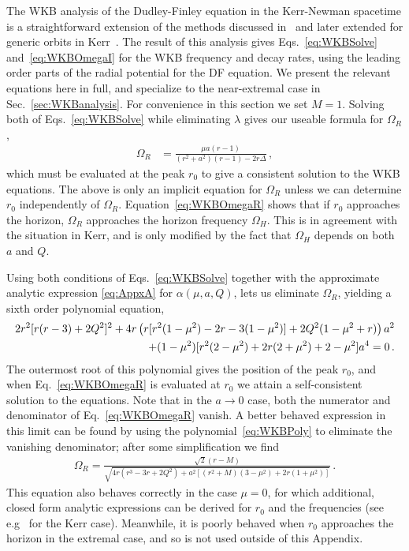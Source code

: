 \begin{refsection}
The WKB analysis of the Dudley-Finley equation in the Kerr-Newman spacetime is a straightforward extension of the methods discussed in~\cite{Schutz:1985zz,IyerWill1987} and later extended for generic orbits in Kerr~\cite{Yang:2012he}. 
The result of this analysis gives Eqs.~\eqref{eq:WKBSolve} and~\eqref{eq:WKBOmegaI} for the WKB frequency and decay rates, using the leading order parts of the radial potential for the DF equation.
We present the relevant equations here in full, and specialize to the near-extremal case in Sec.~\ref{sec:WKBanalysis}. For convenience in this section we set $M=1$.
Solving both of Eqs.~\eqref{eq:WKBSolve} while eliminating $\lambda$ gives our useable formula for $\Omega_R$,
\begin{align}
\label{eq:WKBOmegaR}
\Omega_R & = \frac{\mu a (r - 1)}{(r^2 +a^2)(r -1) - 2 r \Delta}\,,
\end{align}
which must be evaluated at the peak $r_0$ to give a consistent solution to the WKB equations. The above is only an implicit equation for $\Omega_R$ unless we can determine $r_0$ independently of $\Omega_R$. 
Equation~\eqref{eq:WKBOmegaR} shows that if $r_0$ approaches the horizon, $\Omega_R$ approaches the horizon frequency $\Omega_H$. 
This is in agreement with the situation in Kerr, and is only modified by the fact that $\Omega_H$ depends on both $a$ and $Q$.

Using both conditions of Eqs.~\eqref{eq:WKBSolve} together with the approximate analytic expression \eqref{eq:AppxA} for $\alpha(\mu,a,Q)$, lets us eliminate $\Omega_R$, yielding a sixth order polynomial equation, 
\begin{align}
\label{eq:WKBPoly}
2 r^2[r(r-3)+2Q^2]^2 + 4 r\left(r[r^2(1-\mu^2) - 2r -3 (1-\mu^2)]+2Q^2(1-\mu^2 +r) \right)a^2
\notag \\ 
+(1-\mu^2)[r^2(2-\mu^2) + 2r(2+\mu^2) + 2-\mu^2]a^4 =0 \,.
\end{align}
The outermost root of this polynomial gives the position of the peak $r_0$, and when Eq.~\eqref{eq:WKBOmegaR} is evaluated at $r_0$ we attain a self-consistent solution to the equations. 
Note that in the $a \to 0$ case, both the numerator and denominator of Eq.~\eqref{eq:WKBOmegaR} vanish. A better behaved expression in this limit can be found by using the polynomial~\eqref{eq:WKBPoly} to eliminate the vanishing denominator; after some simplification we find
\begin{align}
\label{eq:WKBOmegaRSecond}
\Omega_R = \frac{\sqrt{2}(r - M)}{\sqrt{4r(r^3 - 3 r +2 Q^2) + a^2[(r^2+M)(3-\mu^2)+2r(1+\mu^2)]}}\,.
\end{align}
This equation also behaves correctly in the case $\mu = 0$, for which additional, closed form analytic expressions can be derived for $r_0$ and the frequencies (see e.g~\cite{Teo2003,Dolan2010,Yang:2012he} for the Kerr case). Meanwhile, it is poorly behaved when $r_0$ approaches the horizon in the extremal case, and so is not used outside of this Appendix. 


\end{refsection}
